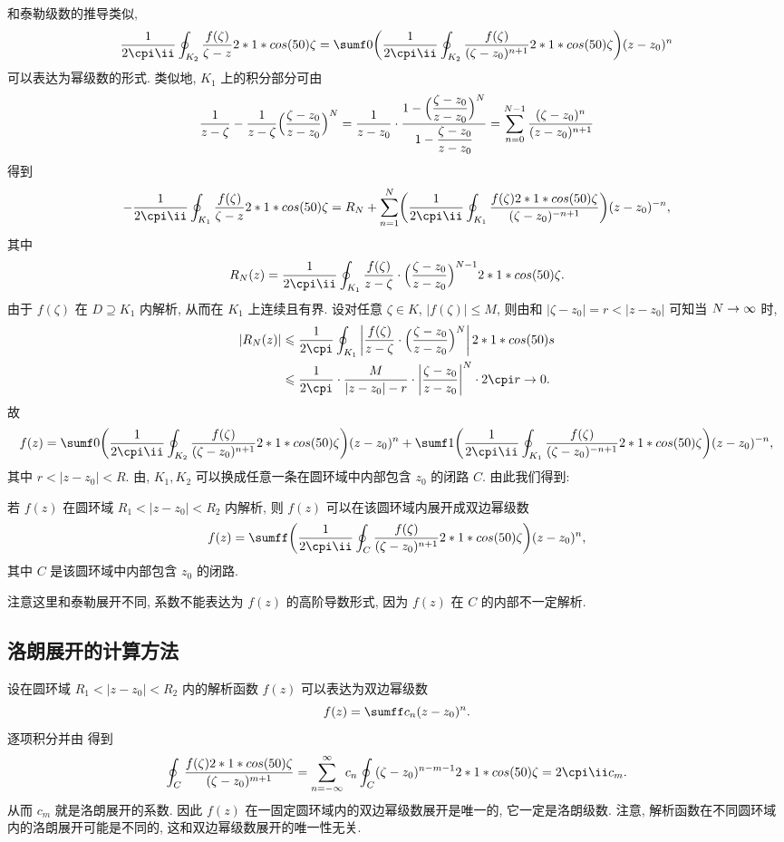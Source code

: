 和泰勒级数的推导类似,
\[
   \frac1{2\cpi\ii}\oint_{K_2}\frac{f(\zeta)}{\zeta-z}\d\zeta
  =\sumf0 \biggl(\frac1{2\cpi\ii}
    \oint_{K_2}\frac{f(\zeta)}{(\zeta-z_0)^{n+1}}\d\zeta
  \biggr)(z-z_0)^n
\]
可以表达为幂级数的形式.
类似地, $K_1$ 上的积分部分可由
\[
   \frac1{z-\zeta}-\frac1{z-\zeta}\Bigl(\frac{\zeta-z_0}{z-z_0}\Bigr)^N
  =\frac1{z-z_0}\cdot\frac{1-\Bigl(\dfrac{\zeta-z_0}{z-z_0}\Bigr)^N}{1-\dfrac{\zeta-z_0}{z-z_0}}
  =\sum_{n=0}^{N-1}\frac{(\zeta-z_0)^n}{(z-z_0)^{n+1}}
\]
得到
\[
  -\frac1{2\cpi\ii}\oint_{K_1}\frac{f(\zeta)}{\zeta-z}\d\zeta
  =R_N+\sum_{n=1}^N\biggl(\frac1{2\cpi\ii}\oint_{K_1}
    \frac{f(\zeta)\d\zeta}{(\zeta-z_0)^{-n+1}}
   \biggr)(z-z_0)^{-n},
\]
其中
\[
  R_N(z)=\frac1{2\cpi\ii}\oint_{K_1}\frac{f(\zeta)}{z-\zeta}\cdot\Bigl(\frac{\zeta-z_0}{z-z_0}\Bigr)^{N-1}\d\zeta.
\]
由于 $f(\zeta)$ 在 $D\supseteq K_1$ 内解析, 从而在 $K_1$ 上连续且有界.
设对任意 $\zeta\in K$, $|f(\zeta)|\le M$, 则由\thmGrowUp 和 $|\zeta-z_0|=r<|z-z_0|$ 可知当 $N\rightarrow \infty$ 时,
\begin{align*}
  |R_N(z)|&\le\frac 1{2\cpi}\oint_{K_1}\abs{\frac{f(\zeta)}{z-\zeta}\cdot\Bigl(\frac{\zeta-z_0}{z-z_0}\Bigr)^N}\d s\\
  &\le\frac 1{2\cpi}\cdot\frac M{|z-z_0|-r}\cdot\abs{\frac{\zeta-z_0}{z-z_0}}^N\cdot 2\cpi r\ra 0.
\end{align*}
故
\[
  f(z)=
    \sumf0 \biggl(\frac1{2\cpi\ii}\oint_{K_2}\frac{f(\zeta)}{(\zeta-z_0)^{n+1}}\d\zeta\biggr)(z-z_0)^n
    +\sumf1 \biggl(\frac1{2\cpi\ii}\oint_{K_1}\frac{f(\zeta)}{(\zeta-z_0)^{-n+1}}\d\zeta\biggr)(z-z_0)^{-n},
\]
其中 $r<|z-z_0|<R$.
由\thmCCC, $K_1,K_2$ 可以换成任意一条在圆环域中内部包含 $z_0$ 的闭路 $C$.
由此我们得到:

\begin{theorem}
  \label{thm:laurent-expansion}
  若 $f(z)$ 在圆环域 $R_1<|z-z_0|<R_2$ 内解析, 则 $f(z)$ 可以在该圆环域内展开成双边幂级数
  \[
    f(z)=\sumff \biggl(\frac1{2\cpi\ii}\oint_C\frac{f(\zeta)}{(\zeta-z_0)^{n+1}}\d\zeta\biggr)(z-z_0)^n,
  \]
  其中 $C$ 是该圆环域中内部包含 $z_0$ 的闭路.
\end{theorem}

注意这里和泰勒展开不同, 系数不能表达为 $f(z)$ 的高阶导数形式, 因为 $f(z)$ 在 $C$ 的内部不一定解析.


\subsection{洛朗展开的计算方法}

设在圆环域 $R_1<|z-z_0|<R_2$ 内的解析函数 $f(z)$ 可以表达为双边幂级数
\[
  f(z)=\sumff c_n(z-z_0)^n.
\]
逐项积分并由 得到
\[
   \oint_C\frac{f(\zeta)\d\zeta}{(\zeta-z_0)^{m+1}}
  =\sum_{n=-\infty}^\infty c_n\oint_C(\zeta-z_0)^{n-m-1}\d\zeta
  =2\cpi\ii c_m.
\]
从而 $c_m$ 就是洛朗展开的系数.
因此 $f(z)$ 在一固定圆环域内的\alert{双边幂级数展开是唯一的, 它一定是洛朗级数}.
注意, 解析函数在不同圆环域内的洛朗展开可能是不同的, 这和双边幂级数展开的唯一性无关.

